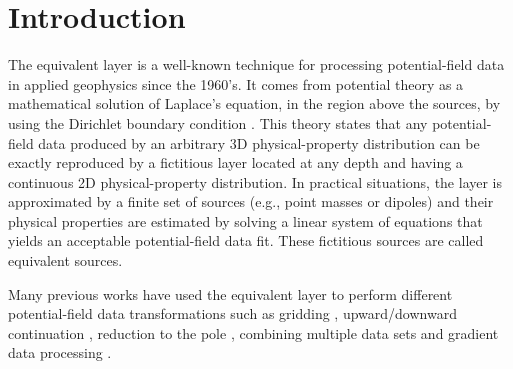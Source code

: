 \section{Introduction}

The equivalent layer is a well-known technique for processing potential-field data in applied geophysics 
since the 1960's. 
It comes from potential theory as a mathematical solution of Laplace's equation, in the region above the
sources, by using the Dirichlet boundary condition \citep{kellogg1929}.
This theory states that any potential-field data produced by an arbitrary 3D physical-property distribution can 
be exactly reproduced by a fictitious layer located at any depth and having a continuous 2D physical-property  
distribution. In practical situations, the layer is approximated by a finite set of sources (e.g., point masses 
or dipoles) and their physical properties are estimated by solving a linear system of equations that yields an 
acceptable potential-field data fit. These fictitious sources are called equivalent sources.

Many previous works have used the equivalent layer to perform different potential-field data 
transformations such as gridding \citep[e.g.,][]{dampney1969, cordell1992, mendonca-silva1994},
upward/downward continuation \citep[e.g.,][]{emilia1973, hansen-miyazaki1984, 
li-oldenburg2010}, reduction to the pole \citep[e.g.,][]{silva1986, leao-silva1989, guspi-novara2009, 
oliveirajr-etal2013}, combining multiple data sets \citep[e.g.,][]{boggs-dransfield2004} and 
gradient data processing \citep[e.g.,][]{barnes-lumley2011}.

